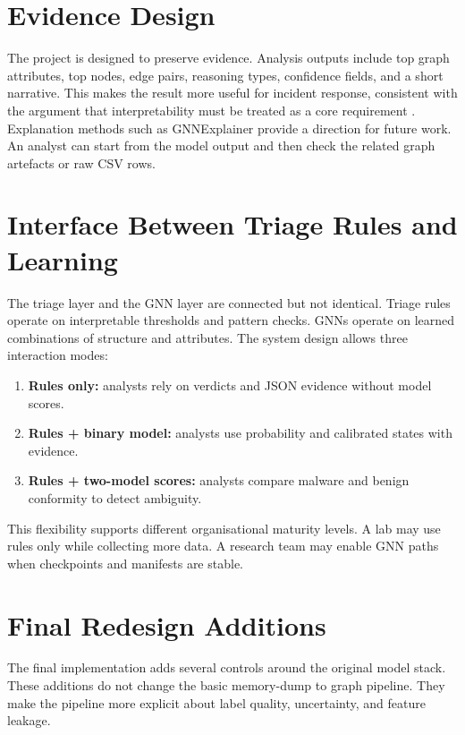 \section{Evidence Design}

The project is designed to preserve evidence. Analysis outputs include top graph attributes, top nodes, edge pairs, reasoning types, confidence fields, and a short narrative. This makes the result more useful for incident response, consistent with the argument that interpretability must be treated as a core requirement \cite{doshi2017interpretable}. Explanation methods such as GNNExplainer \cite{ying2019gnnexplainer} provide a direction for future work. An analyst can start from the model output and then check the related graph artefacts or raw CSV rows.

\section{Interface Between Triage Rules and Learning}

The triage layer and the GNN layer are connected but not identical. Triage rules operate on interpretable thresholds and pattern checks. GNNs operate on learned combinations of structure and attributes. The system design allows three interaction modes:

\begin{enumerate}
\item \textbf{Rules only:} analysts rely on verdicts and JSON evidence without model scores.
\item \textbf{Rules + binary model:} analysts use probability and calibrated states with evidence.
\item \textbf{Rules + two-model scores:} analysts compare malware and benign conformity to detect ambiguity.
\end{enumerate}

This flexibility supports different organisational maturity levels. A lab may use rules only while collecting more data. A research team may enable GNN paths when checkpoints and manifests are stable.

\section{Final Redesign Additions}

The final implementation adds several controls around the original model stack. These additions do not change the basic memory-dump to graph pipeline. They make the pipeline more explicit about label quality, uncertainty, and feature leakage.

